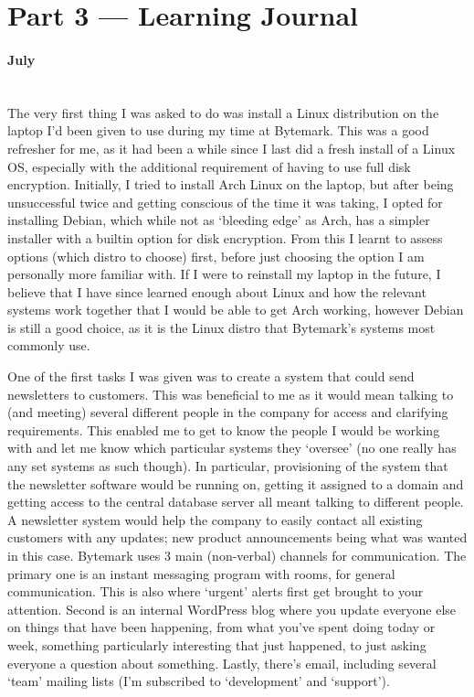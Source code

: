 \documentclass[12pt,a4paper]{article}
\newcommand{\paragraphnl}[1]{\paragraph{#1}\mbox{}\\}
\begin{document}
\section*{Part 3 --- Learning Journal}
\paragraphnl{July}
	The very first thing I was asked to do was install a Linux distribution on
	the laptop I'd been given to use during my time at Bytemark. This was a
	good refresher for me, as it had been a while since I last did a fresh
	install of a Linux OS, especially with the additional requirement of having
	to use full disk encryption. Initially, I tried to install Arch Linux on
	the laptop, but after being unsuccessful twice and getting conscious of the
	time it was taking, I opted for installing Debian, which while not as
	`bleeding edge' as Arch, has a simpler installer with a builtin option for
	disk encryption. From this I learnt to assess options (which distro to
	choose) first, before just choosing the option I am personally more
	familiar with. If I were to reinstall my laptop in the future, I believe
	that I have since learned enough about Linux and how the relevant systems
	work together that I would be able to get Arch working, however Debian is
	still a good choice, as it is the Linux distro that Bytemark's systems most
	commonly use.

	One of the first tasks I was given was to create a system that could send
	newsletters to customers. This was beneficial to me as it would mean
	talking to (and meeting) several different people in the company for access
	and	clarifying requirements. This enabled me to get to know the people I
	would be working with and let me know which particular systems they
	`oversee' (no one really has any set systems as such though). In
	particular, provisioning of the system that the newsletter software would
	be running on, getting it assigned to a domain and getting access to the
	central database server all	meant talking to different people. A newsletter
	system would help the company to easily contact all existing customers with
	any updates; new product announcements being what was wanted in this case.
	Bytemark uses 3 main (non-verbal) channels for communication. The primary
	one is an instant messaging program with rooms, for general communication.
	This is also where `urgent' alerts first get brought to your attention.
	Second is an internal WordPress blog where you update everyone else on
	things that have been happening, from what you've spent doing today or
	week, something particularly interesting that just happened, to just asking
	everyone a question about something. Lastly, there's email, including
	several `team' mailing lists (I'm subscribed to `development' and
	`support').
\end{document}
